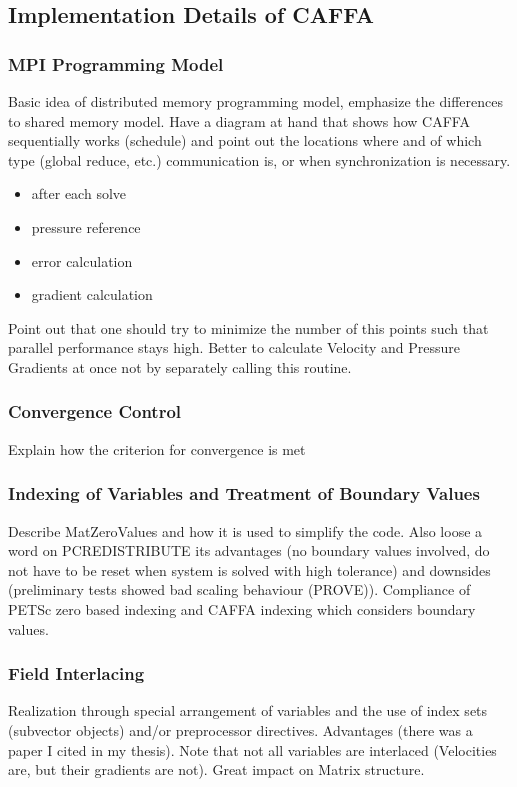 \subsection{Implementation Details of CAFFA}

\subsubsection{MPI Programming Model}
Basic idea of distributed memory programming model, emphasize the differences to shared memory model. Have a diagram at hand that shows how CAFFA sequentially works (schedule) and point out the locations where and of which type (global reduce, etc.) communication is, or when synchronization is necessary.
\begin{itemize}
  \item after each solve
  \item pressure reference
  \item error calculation
  \item gradient calculation
\end{itemize}
        
Point out that one should try to minimize the number of this points such that parallel performance stays high. Better to calculate Velocity and Pressure Gradients at once not by separately calling this routine.

\subsubsection{Convergence Control} 
\label{sec:convergence}
Explain how the criterion for convergence is met 

\subsubsection{Indexing of Variables and Treatment of Boundary Values}
Describe MatZeroValues and how it is used to simplify the code. Also loose a word on PCREDISTRIBUTE its advantages (no boundary values involved, do not have to be reset when system is solved with high tolerance) and downsides (preliminary tests showed bad scaling behaviour (PROVE)). Compliance of PETSc zero based indexing and CAFFA indexing which considers boundary values.
\subsubsection{Field Interlacing}
Realization through special arrangement of variables and the use of index sets (subvector objects) and/or preprocessor directives. Advantages (there was a paper I cited in my thesis). Note that not all variables are interlaced (Velocities are, but their gradients are not). Great impact on Matrix structure.
